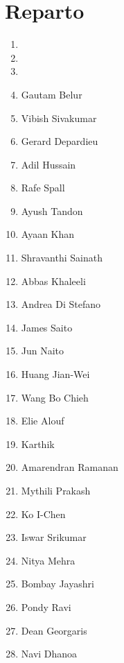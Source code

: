 \documentclass[a5 paper, 11pt]{article}
\begin{document}
\section{Reparto}
\begin{multicols}{2}
\begin{enumerate}
    \item {}
    \item {}
    \item {} 
    \item Gautam Belur
    \item Vibish Sivakumar
    \item Gerard Depardieu
    \newpage
    \item Adil Hussain 
    \item Rafe Spall
    \item Ayush Tandon
    \item Ayaan Khan
    \item Shravanthi Sainath
    \item Abbas Khaleeli
    \item Andrea Di Stefano
    \item James Saito
    \item Jun Naito
    \item Huang Jian-Wei
    \item Wang Bo Chieh
    \item Elie Alouf
    \item Karthik
    \item Amarendran Ramanan
    \item Mythili Prakash
    \item Ko I-Chen
    \item Iswar Srikumar
    \item Nitya Mehra
    \item Bombay Jayashri
    \item Pondy Ravi
    \item Dean Georgaris
    \item Navi Dhanoa

\end{enumerate}
\end{multicols}
\end{document}
